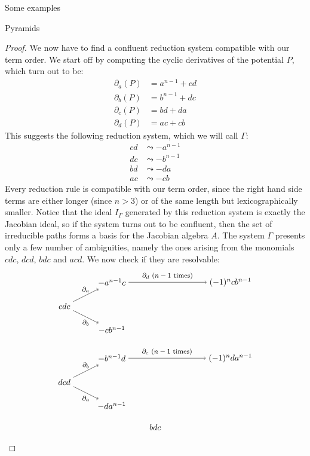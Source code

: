 \begin{chapter}{Some examples}
\begin{section}{Pyramids}
\begin{proof}
We now have to find a confluent reduction system compatible with our term order. We start off by computing the cyclic derivatives of the potential $P$, which turn out to be:
\begin{align*}
\partial_a(P) &= a^{n-1} + cd\\
\partial_b(P) &= b^{n-1} + dc\\
\partial_c(P) &= bd + da\\
\partial_d(P) &= ac + cb
\end{align*}
This suggests the following reduction system, which we will call $\Gamma$:
\begin{align*}
cd &\leadsto -a^{n-1}\tag{$\partial_a$}\\
dc &\leadsto -b^{n-1}\tag{$\partial_b$}\\
bd &\leadsto -da\tag{$\partial_c$}\\
ac &\leadsto -cb\tag{$\partial_d$}
\end{align*}
Every reduction rule is compatible with our term order, since the right hand side terms are either longer (since $n>3$) or of the same length but lexicographically smaller. Notice that the ideal $I_\Gamma$ generated by this reduction system is exactly the Jacobian ideal, so if the system turns out to be confluent, then the set of irreducible paths forms a basis for the Jacobian algebra $A$. The system $\Gamma$ presents only a few number of ambiguities, namely the ones arising from the monomials $cdc$, $dcd$, $bdc$ and $acd$. We now check if they are resolvable:
\[
\begin{tikzpicture}
\node (1) at (0,0) {$cdc$};
\node (a2) at (2,1) {$-a^{n-1}c$};
\node (b2) at (2,-1) {$-cb^{n-1}$};
\node (a3) at (7,1) {$(-1)^n cb^{n-1}$};
\draw[->] (1) to node[above, font=\footnotesize]{$\partial_a$} (a2);
\draw[->] (1) to node[below, font=\footnotesize]{$\partial_b$} (b2);
\draw[->] (a2) to node[above, font=\footnotesize]{$\partial_d$ ($n-1$ times)} (a3);
\end{tikzpicture}
\]
\[
\begin{tikzpicture}
\node (1) at (0,0) {$dcd$};
\node (a2) at (2,1) {$-b^{n-1}d$};
\node (b2) at (2,-1) {$-da^{n-1}$};
\node (a3) at (7,1) {$(-1)^n da^{n-1}$};
\draw[->] (1) to node[above, font=\footnotesize]{$\partial_b$} (a2);
\draw[->] (1) to node[below, font=\footnotesize]{$\partial_a$} (b2);
\draw[->] (a2) to node[above, font=\footnotesize]{$\partial_c$ ($n-1$ times)} (a3);
\end{tikzpicture}
\]
\[
\begin{tikzpicture}
\node (1) at (0,0) {$bdc$};

\end{tikzpicture}\]
\end{proof}
\end{section}
\end{chapter}
